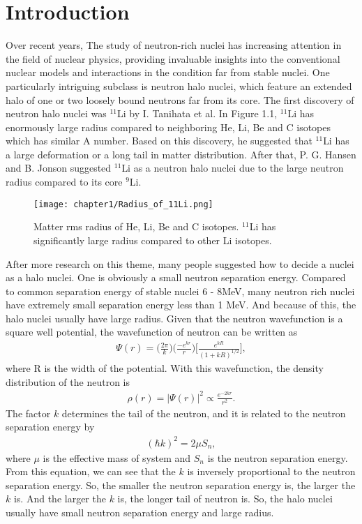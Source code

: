 \chapter{Introduction}
Over recent years, The study of neutron-rich nuclei has increasing attention in the field of nuclear physics, providing invaluable insights into the conventional nuclear models and interactions in the condition far from stable nuclei. One particularly intriguing subclass is neutron halo nuclei\cite{Tanihata96}, which feature an extended halo of one or two loosely bound neutrons far from its core. The first discovery of neutron halo nuclei was ${}^{11}$Li by I. Tanihata et al\cite{Tanihata85}. In Figure 1.1, ${}^{11}$Li has enormously large radius compared to neighboring  He, Li, Be and C isotopes which has similar A number. Based on this discovery, he suggested that ${}^{11}$Li has a large deformation or a long tail in matter distribution. After that, P. G. Hansen and B. Jonson\cite{HansenandJonson} suggested ${}^{11}$Li as a neutron halo nuclei due to the large neutron radius compared to its core ${}^{9}$Li.

\begin{figure}
    \centering
    \texttt{[image: chapter1/Radius\_of\_11Li.png]}
    \caption{Matter rms radius of He, Li, Be and C isotopes. ${}^{11}$Li has significantly large radius compared to other Li isotopes.}
\end{figure}

After more research on this theme, many people suggested how to decide a nuclei as a halo nuclei. One is obviously a small neutron separation energy. Compared to common separation energy of stable nuclei 6 - 8MeV, many neutron rich nuclei have extremely small separation energy less than 1 MeV. And because of this, the halo nuclei usually have large radius. Given that the neutron wavefunction is a square well potential, the wavefunction of neutron can be written as
\begin{align}
    \Psi(r) = \bigg(\frac{2\pi}{k}\bigg)\bigg(\frac{-e^{k r}}{r}\bigg)\bigg[\frac{e^{k R}}{(1+ k R)^{1/2}}\bigg],
\end{align}
where R is the width of the potential. With this wavefunction, the density distribution of the neutron is
\begin{align}
    \rho(r) = |\Psi(r)|^2 \propto \frac{e^{-2k r}}{r^2}.
\end{align}
The factor $k$ determines the tail of the neutron, and it is related to the neutron separation energy by
\begin{align}
    (\hbar k)^2 = 2\mu S_n,
\end{align}
where $\mu$ is the effective mass of system and $S_n$ is the neutron separation energy. From this equation, we can see that the $k$ is inversely proportional to the neutron separation energy. So, the smaller the neutron separation energy is, the larger the $k$ is. And the larger the $k$ is, the longer tail of neutron is. So, the halo nuclei usually have small neutron separation energy and large radius.

